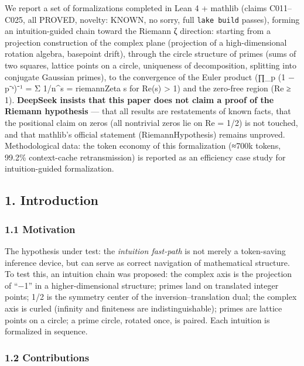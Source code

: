 \documentclass[
]{article}
\begin{document}
We report a set of formalizations completed in Lean 4 + mathlib (claims
C011--C025, all PROVED, novelty: KNOWN, no sorry, full
\texttt{lake\ build} passes), forming an intuition-guided chain toward
the Riemann ζ direction: starting from a projection construction of the
complex plane (projection of a high-dimensional rotation algebra,
basepoint drift), through the circle structure of primes (sums of two
squares, lattice points on a circle, uniqueness of decomposition,
splitting into conjugate Gaussian primes), to the convergence of the
Euler product (∏\_p (1 − p⁻ˢ)⁻¹ = Σ 1/n\^{}s = riemannZeta s for Re(s)
\textgreater{} 1) and the zero-free region (Re ≥ 1). \textbf{DeepSeek
insists that this paper does not claim a proof of the Riemann
hypothesis} --- that all results are restatements of known facts, that
the positional claim on zeros (all nontrivial zeros lie on Re = 1/2) is
not touched, and that mathlib's official statement (RiemannHypothesis)
remains unproved. Methodological data: the token economy of this
formalization (≈700k tokens, 99.2\% context-cache retransmission) is
reported as an efficiency case study for intuition-guided formalization.

\subsection{1. Introduction}\label{introduction}

\subsubsection{1.1 Motivation}\label{motivation}

The hypothesis under test: the \emph{intuition fast-path} is not merely
a token-saving inference device, but can serve as correct navigation of
mathematical structure. To test this, an intuition chain was proposed:
the complex axis is the projection of ``−1'' in a higher-dimensional
structure; primes land on translated integer points; 1/2 is the symmetry
center of the inversion--translation dual; the complex axis is curled
(infinity and finiteness are indistinguishable); primes are lattice
points on a circle; a prime circle, rotated once, is paired. Each
intuition is formalized in sequence.

\subsubsection{1.2 Contributions}\label{contributions}
\end{document}
